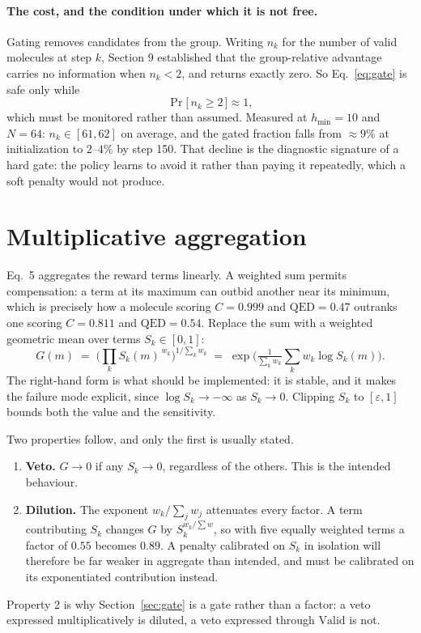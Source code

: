 \documentclass[11pt]{article}
\newcommand{\1}{\mathbb{1}}
\newcommand{\Valid}{\mathrm{Valid}}
\begin{document}
\paragraph{The cost, and the condition under which it is not free.}
Gating removes candidates from the group. Writing $n_k$ for the number of
valid molecules at step $k$, Section 9 established that the group-relative
advantage carries no information when $n_k < 2$, and returns exactly zero.
So Eq.~\eqref{eq:gate} is safe only while
\begin{equation}
\Pr\big[\,n_k \ge 2\,\big] \approx 1 ,
\label{eq:starvation}
\end{equation}
which must be monitored rather than assumed. Measured at $h_{\min}=10$ and
$N=64$: $n_k \in [61,62]$ on average, and the gated fraction falls from
$\approx 9\%$ at initialization to $2$--$4\%$ by step 150. That decline is
the diagnostic signature of a hard gate: the policy learns to avoid it
rather than paying it repeatedly, which a soft penalty would not produce.

\section{Multiplicative aggregation}
\label{sec:geom}

Eq.~5 aggregates the reward terms linearly. A weighted sum permits
compensation: a term at its maximum can outbid another near its minimum,
which is precisely how a molecule scoring $C=0.999$ and $\mathrm{QED}=0.47$
outranks one scoring $C=0.811$ and $\mathrm{QED}=0.54$. Replace the sum
with a weighted geometric mean over terms $S_k \in [0,1]$:
\begin{equation}
G(m) \;=\; \Big(\textstyle\prod_k S_k(m)^{\,w_k}\Big)^{1/\sum_k w_k}
\;=\; \exp\!\Big(\tfrac{1}{\sum_k w_k}\textstyle\sum_k w_k \log S_k(m)\Big).
\label{eq:geom}
\end{equation}
The right-hand form is what should be implemented: it is stable, and it
makes the failure mode explicit, since $\log S_k \to -\infty$ as
$S_k \to 0$. Clipping $S_k$ to $[\varepsilon, 1]$ bounds both the value and
the sensitivity.

Two properties follow, and only the first is usually stated.
\begin{enumerate}[nosep]
  \item \textbf{Veto.} $G \to 0$ if any $S_k \to 0$, regardless of the
  others. This is the intended behaviour.
  \item \textbf{Dilution.} The exponent $w_k / \sum_j w_j$ attenuates every
  factor. A term contributing $S_k$ changes $G$ by $S_k^{w_k/\sum w}$,
  so with five equally weighted terms a factor of $0.55$ becomes $0.89$.
  A penalty calibrated on $S_k$ in isolation will therefore be far weaker
  in aggregate than intended, and must be calibrated on its exponentiated
  contribution instead.
\end{enumerate}
Property 2 is why Section~\ref{sec:gate} is a gate rather than a factor:
a veto expressed multiplicatively is diluted, a veto expressed through
$\Valid$ is not.
\end{document}
